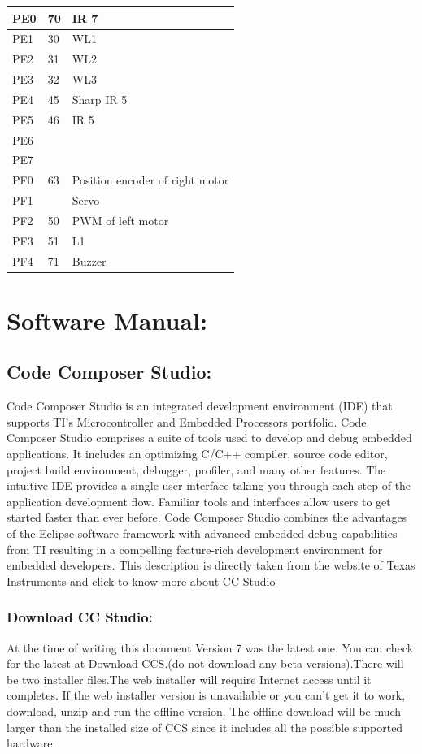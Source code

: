 \documentclass[a4paper,10pt,oneside]{article}
\begin{document}
{\begin{longtable}{|p{}|p{}|p{}|}
			PE0&	70&IR 7\\ \hline
			PE1&	30&	WL1\\ \hline
			PE2&	31&	WL2\\ \hline
			PE3&	32&	WL3\\ \hline
			PE4&	45&	Sharp IR 5\\ \hline
			PE5&	46&	IR 5\\ \hline
			PE6&	&\\ \hline
			PE7&	&	\\ \hline
			
			PF0&	63&	Position encoder of right motor\\ \hline
			PF1&	&	Servo\\ \hline
			PF2&	50&	PWM of left motor\\ \hline
			PF3&	51	&L1\\ \hline
			PF4&	71&	Buzzer\\ \hline
			
		\end{longtable}
	\newpage
	\section{\Huge\textbf{Software Manual:}}
		\subsection{\huge \textbf{Code Composer Studio:}}
			{\large Code Composer Studio is an integrated development environment (IDE) that supports TI's Microcontroller and Embedded Processors portfolio. Code Composer Studio comprises a suite of tools used to develop and debug embedded applications. It includes an optimizing C/C++ compiler, source code editor, project build environment, debugger, profiler, and many other features. The intuitive IDE provides a single user interface taking you through each step of the application development flow. Familiar tools and interfaces allow users to get started faster than ever before. Code Composer Studio combines the advantages of the Eclipse software framework with advanced embedded debug capabilities from TI resulting in a compelling feature-rich development environment for embedded developers. This description is directly taken from the website of Texas Instruments and click to know more	\href{http://www.ti.com/tool/ccstudio}{about CC Studio}}}%
			\subsubsection{\Large\textbf{Download CC Studio:}}
			{\large At the time of writing this document Version 7 was the latest one. You can check for the latest at \href{http://processors.wiki.ti.com/index.php/Download_CCS}{Download CCS}.(do not download
				any beta versions).There will be two installer files.The web installer will require Internet access until it	completes. If the web installer version is unavailable or you can’t get it to work,
				download, unzip and run the offline version. The offline download will be much larger
				than the installed size of CCS since it includes all the possible supported hardware.}
\end{document}
